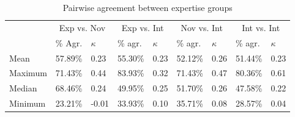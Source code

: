 		\begin{table}[htb]
			\centering
			\caption{Pairwise agreement between expertise groups }
			\begin{tabularx}{\textwidth}{lXXXXXXXX}
				\toprule
		& \multicolumn{2}{c}{Exp vs. Nov} & \multicolumn{2}{c}{Exp vs. Int} & \multicolumn{2}{c}{Nov vs. Int} & \multicolumn{2}{c}{Int vs. Int} \\
	&\% Agr.	& $\kappa$	&\% agr. &	$\kappa$&	\% agr.	& $\kappa$	&\% agr. & $\kappa$ \\
	\midrule
Mean	& 57.89\%	& 0.23	& 55.30\%	& 0.23	& 52.12\%	& 0.26	& 51.44\%	& 0.23 \\
Maximum	& 71.43\%	& 0.44	& 83.93\%	& 0.32	& 71.43\% & 	0.47	& 80.36\%	& 0.61 \\
Median	& 68.46\%	& 0.24	& 49.95\%	& 0.25	& 51.70\%	& 0.26	& 47.58\%	& 0.22\\
Minimum	& 23.21\%	& -0.01	& 33.93\%	& 0.10	& 35.71\%	& 0.08	& 28.57\%	&  0.04 \\
				\bottomrule
			\end{tabularx}
			\label{tab:agreement:expertise}
		\end{table}
			
		
		
